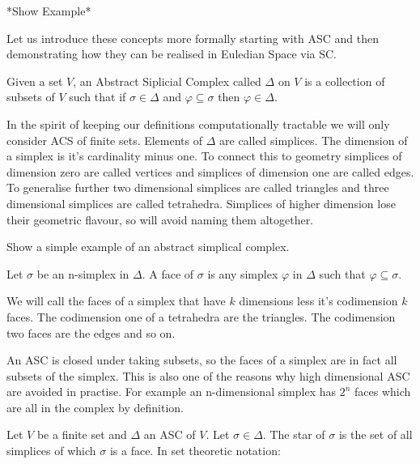 *Show Example*

Let us introduce these concepts more formally starting with ASC and then demonstrating how they can be realised in Euledian Space via SC.

\begin{defn} Given a set $V$, an Abstract Siplicial Complex called $\Delta$ on $V$ is a collection of subsets of $V$ such that if $\sigma \in \Delta$ and $\varphi \subseteq \sigma$ then $\varphi \in \Delta$.  \end{defn}

In the spirit of keeping our definitions computationally tractable we will only consider ACS of finite sets. Elements of $\Delta$ are called simplices. The dimension of a simplex is it's cardinality minus one. To connect this to geometry simplices of dimension zero are called vertices and simplices of dimension one are called edges. To generalise further two dimensional simplices are called triangles and three dimensional simplices are called tetrahedra. Simplices of higher dimension lose their geometric flavour, so will avoid naming them altogether.


\begin{ex} Show a simple example of an abstract simplical complex. \end{ex}


\begin{defn} Let $\sigma$ be an n-simplex in $\Delta$. A face of $\sigma$ is any simplex $\varphi$ in $\Delta$ such that $\varphi \subseteq \sigma$. \end{defn}

We will call the faces of a simplex that have $k$ dimensions less it's codimension $k$ faces. The codimension one of a tetrahedra are the triangles. The codimension two faces are the edges and so on. 

An ASC is closed under taking subsets, so the faces of a simplex are in fact all subsets of the simplex. This is also one of the reasons why high dimensional ASC are avoided in practise. For example an n-dimensional simplex has $2^n$ faces which are all in the complex by definition.

\begin{defn} Let $V$ be a finite set and $\Delta$ an ASC of $V$. Let $\sigma \in \Delta$. The star of $\sigma$ is the set of all simplices of which $\sigma$ is a face. In set theoretic notation:\end{defn}

